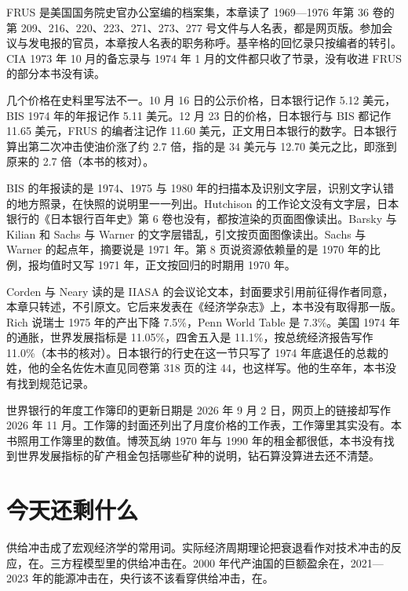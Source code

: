 \begin{deeper}[史料说明]
FRUS 是美国国务院史官办公室编的档案集，本章读了 1969—1976 年第 36 卷的第 209、216、220、223、271、273、277 号文件与人名表，都是网页版。参加会议与发电报的官员，本章按人名表的职务称呼。基辛格的回忆录只按编者的转引。CIA 1973 年 10 月的备忘录与 1974 年 1 月的文件都只收了节录，没有收进 FRUS 的部分本书没有读。

几个价格在史料里写法不一。10 月 16 日的公示价格，日本银行记作 5.12 美元，BIS 1974 年的年报记作 5.11 美元。12 月 23 日的价格，日本银行与 BIS 都记作 11.65 美元，FRUS 的编者注记作 11.60 美元，正文用日本银行的数字。日本银行算出第二次冲击使油价涨了约 2.7 倍，指的是 34 美元与 12.70 美元之比，即涨到原来的 2.7 倍（本书的核对）。

BIS 的年报读的是 1974、1975 与 1980 年的扫描本及识别文字层，识别文字认错的地方照录，在快照的说明里一一列出。Hutchison 的工作论文没有文字层，日本银行的《日本银行百年史》第 6 卷也没有，都按渲染的页面图像读出。Barsky 与 Kilian 和 Sachs 与 Warner 的文字层错乱，引文按页面图像读出。Sachs 与 Warner 的起点年，摘要说是 1971 年。第 8 页说资源依赖量的是 1970 年的比例，报均值时又写 1971 年，正文按回归的时期用 1970 年。

Corden 与 Neary 读的是 IIASA 的会议论文本，封面要求引用前征得作者同意，本章只转述，不引原文。它后来发表在《经济学杂志》上，本书没有取得那一版。Rich 说瑞士 1975 年的产出下降 7.5\%，Penn World Table 是 7.3\%。美国 1974 年的通胀，世界发展指标是 11.05\%，四舍五入是 11.1\%，按总统经济报告写作 11.0\%（本书的核对）。日本银行的行史在这一节只写了 1974 年底退任的总裁的姓，他的全名佐佐木直见同卷第 318 页的注 44，也这样写。他的生卒年，本书没有找到规范记录。

世界银行的年度工作簿印的更新日期是 2026 年 9 月 2 日，网页上的链接却写作 2026 年 11 月。工作簿的封面还列出了月度价格的工作表，工作簿里其实没有。本书照用工作簿里的数值。博茨瓦纳 1970 年与 1990 年的租金都很低，本书没有找到世界发展指标的矿产租金包括哪些矿种的说明，钻石算没算进去还不清楚。
\end{deeper}

\section{今天还剩什么}\label{sec:oil-legacy}

供给冲击成了宏观经济学的常用词。实际经济周期理论把衰退看作对技术冲击的反应，在。三方程模型里的供给冲击在。2000 年代产油国的巨额盈余在，2021—2023 年的能源冲击在，央行该不该看穿供给冲击，在。

